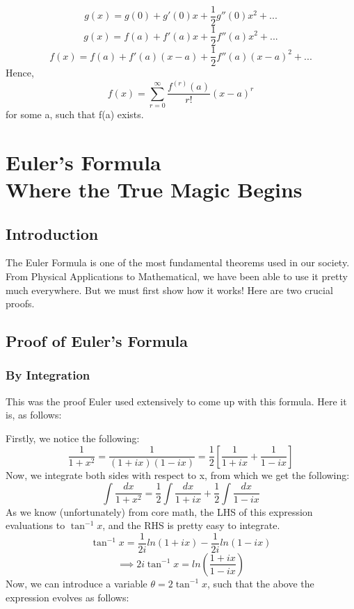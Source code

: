 \documentclass[a4paper,12pt,oneside]{book}
\begin{document}
\[g(x) = g(0) + g'(0)x + \frac{1}{2}g''(0)x^2 + ...\]
\[g(x) = f(a) + f'(a)x + \frac{1}{2}f''(a)x^2 + ...\]
\[f(x) = f(a) + f'(a)(x - a) + \frac{1}{2}f''(a)(x - a)^2 + ...\]
Hence, 
\[ f(x) = \sum_{r = 0}^{\infty} \frac{f^{(r)}(a)}{r!} (x-a)^r \]
for some a, such that f(a) exists.


\newpage

\part{Euler's Formula \\ Where the True Magic Begins}

\newpage

\chapter{Introduction}
The Euler Formula is one of the most fundamental theorems used in our society. From Physical Applications to Mathematical, we have been able to use it pretty much everywhere. But we must first show how it works! Here are two crucial proofs.

\newpage

\chapter{Proof of Euler's Formula}

\section{By Integration}
This was the proof Euler used extensively to come up with this formula. Here it is, as follows:

Firstly, we notice the following:
\[ \frac{1}{1 + x^2} = \frac{1}{(1+ix)(1-ix)} = \frac{1}{2} \left [ \frac{1}{1 + ix} + \frac{1}{1 - ix} \right ]  \]
Now, we integrate both sides with respect to x, from which we get the following:
\[ \int \frac{dx}{1 + x^2} = \frac{1}{2} \int \frac{dx}{1 + ix} +  \frac{1}{2} \int \frac{dx}{1 - ix}  \]
As we know (unfortunately) from core math, the LHS of this expression evaluations to $\tan^{-1} x$, and the RHS is pretty easy to integrate.
\[ \tan^{-1} x = \frac{1}{2i} ln \left (1 + ix \right ) -  \frac{1}{2i} ln \left (1 - ix \right ) \]
\[ \implies 2i \tan^{-1} x = ln \left (\frac{1 + ix}{1 - ix} \right ) \]
Now, we can introduce a variable $\theta = 2 \tan^{-1} x$, such that the above the expression evolves as follows:
\end{document}
